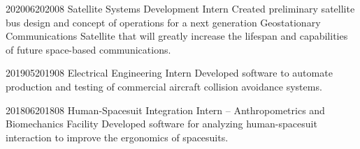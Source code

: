 \documentclass[../Resume]{subfiles}
\begin{document}

        {2020}{06}{2020}{08}
        {Satellite Systems Development Intern}
        {Created preliminary satellite bus design and concept of operations 
        for a next generation Geostationary Communications Satellite that will greatly increase the 
        lifespan and capabilities of future space-based communications. }

        {2019}{05}{2019}{08}
        {Electrical Engineering Intern}
        {Developed software to automate production and testing of commercial aircraft
            collision avoidance systems.}

        {2018}{06}{2018}{08}
        {Human-Spacesuit Integration Intern -- Anthropometrics and Biomechanics Facility}
        {Developed software for analyzing human-spacesuit interaction to improve the ergonomics
            of spacesuits.}

\end{document}
